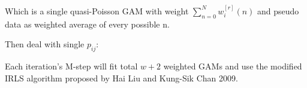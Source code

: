 \documentclass[]{article}
\begin{document}
Which is a single quasi-Poisson GAM with weight $\sum_{n=0}^{N}w_{i}^{[r]}(n)$ and pseudo data as weighted average of every possible n.

Then deal with single $p_{ij}$:


Each iteration's M-step will fit total $w+2$ weighted GAMs and use the modified IRLS algorithm proposed by Hai Liu and Kung-Sik Chan 2009.
\end{document}
